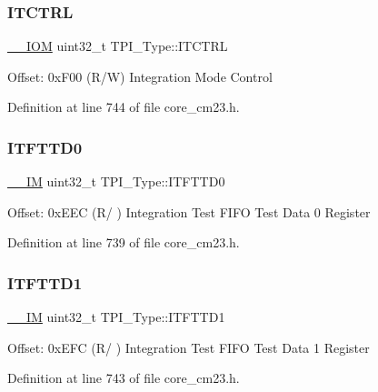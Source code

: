 \subsubsection{\texorpdfstring{I\+T\+C\+T\+RL}{ITCTRL}}
{\footnotesize\ttfamily \hyperlink{core__sc300_8h_ab6caba5853a60a17e8e04499b52bf691}{\+\_\+\+\_\+\+I\+OM} uint32\+\_\+t T\+P\+I\+\_\+\+Type\+::\+I\+T\+C\+T\+RL}

Offset\+: 0x\+F00 (R/W) Integration Mode Control 

Definition at line 744 of file core\+\_\+cm23.\+h.

\mbox{\label{struct_t_p_i___type_a4c53b48c6bb49037c97742136d14b4f7}} 
\subsubsection{\texorpdfstring{I\+T\+F\+T\+T\+D0}{ITFTTD0}}
{\footnotesize\ttfamily \hyperlink{core__sc300_8h_a4cc1649793116d7c2d8afce7a4ffce43}{\+\_\+\+\_\+\+IM} uint32\+\_\+t T\+P\+I\+\_\+\+Type\+::\+I\+T\+F\+T\+T\+D0}

Offset\+: 0x\+E\+EC (R/ ) Integration Test F\+I\+FO Test Data 0 Register 

Definition at line 739 of file core\+\_\+cm23.\+h.

\mbox{\label{struct_t_p_i___type_aaf0447dd4b2c16dc1db1e2172c9dac8f}} 
\subsubsection{\texorpdfstring{I\+T\+F\+T\+T\+D1}{ITFTTD1}}
{\footnotesize\ttfamily \hyperlink{core__sc300_8h_a4cc1649793116d7c2d8afce7a4ffce43}{\+\_\+\+\_\+\+IM} uint32\+\_\+t T\+P\+I\+\_\+\+Type\+::\+I\+T\+F\+T\+T\+D1}

Offset\+: 0x\+E\+FC (R/ ) Integration Test F\+I\+FO Test Data 1 Register 

Definition at line 743 of file core\+\_\+cm23.\+h.

\mbox{\label{struct_t_p_i___type_ae3a3197c7be6ce07b50fd87cbb02f319}} 
